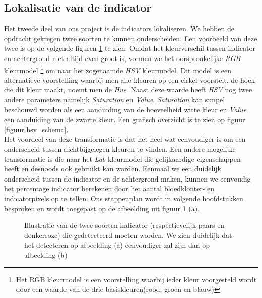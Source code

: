 \documentclass[a4paper,kulak]{kulakarticle}
\begin{document}
	\subsection{Lokalisatie van de indicator}
		Het tweede deel van ons project is de indicators lokaliseren. We hebben de opdracht gekregen twee soorten te kunnen onderscheiden. Een voorbeeld van deze twee is op de volgende figuren \ref{figuur indicators} te zien. Omdat het kleurverschil tussen indicator en achtergrond niet altijd even groot is, vormen we het oorspronkelijke \textit{RGB} kleurmodel \footnote{Het RGB kleurmodel is een voorstelling waarbij ieder kleur voorgesteld wordt door een waarde van de drie basiskleuren(rood, groen en blauw)} om naar het zogenaamde \textit{HSV} kleurmodel. Dit model is een alternatieve voorstelling waarbij men alle kleuren op een cirkel voorstelt, de hoek die dit kleur maakt, noemt men de \textit{Hue}. Naast deze waarde heeft \textit{HSV} nog twee andere parameters namelijk \textit{Saturation} en \textit{Value}. \textit{Saturation} kan simpel beschouwd worden als een aanduiding van de hoeveelheid witte kleur en \textit{Value} een aanduiding van de zwarte kleur. Een grafisch overzicht is te zien op figuur \ref{figuur hsv_schema}.\\
		Het voordeel van deze transformatie is dat het heel wat eenvoudiger is om een onderscheid tussen dichtbijgelegen kleuren te vinden. Een andere mogelijke transformatie is die naar het \textit{Lab} kleurmodel die gelijkaardige eigenschappen heeft en desnoods ook gebruikt kan worden. Eenmaal we een duidelijk onderscheid tussen de indicator en de achtergrond maken, kunnen we eenvoudig het percentage indicator berekenen door het aantal bloedklonter- en indicatorpixels op te tellen. Ons stappenplan wordt in volgende hoofdstukken besproken en wordt toegepast op de afbeelding uit figuur \ref{figuur indicators} (a).
	
	\begin{figure}[H]
	\centering
	\qquad
	
	\caption{Illustratie van de twee soorten indicator (respectievelijk paars en donkerroze) die gedetecteerd moeten worden. We zien duidelijk dat het detecteren op afbeelding (a) eenvoudiger zal zijn dan op afbeelding (b)}
	\label{figuur indicators}
	\end{figure}
\end{document}
